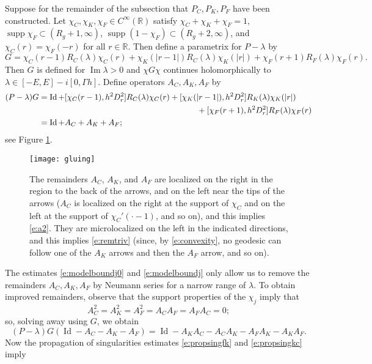 \documentclass[reqno, 12pt]{amsart}
\newcommand \R {\mathbb{R}}
\newcommand \Oh {\mathcal{O}}
\DeclareMathOperator \im {Im}
\DeclareMathOperator \supp {supp}
\DeclareMathOperator \Id {Id}
\theoremstyle{definition}
\numberwithin{equation}{section}
\numberwithin{prop}{section}
\numberwithin{figure}{section}
\begin{document}
Suppose for the remainder of the subsection that $P_C,P_K,P_F$ have been constructed. Let $\chi_C,\chi_K,\chi_F \in C^\infty(\R)$ satisfy $\chi_C + \chi_K + \chi_F = 1$,   $\supp \chi_F \subset (R_g + 1, \infty)$, $\supp (1-\chi_F) \subset (R_g+2,\infty)$, and $\chi_C(r) = \chi_F(-r)$ for all $r \in \R$. Then define a parametrix for $P-\lambda$ by
\[
G = \chi_C(r - 1)R_C(\lambda) \chi_C(r) + \chi_K(|r - 1|)R_C(\lambda) \chi_K(|r|) + \chi_F(r + 1)R_F(\lambda) \chi_F(r).
\]
Then $G$ is defined for $\im \lambda > 0$ and $\chi G \chi$ continues holomorphically to $\lambda \in [-E,E] - i[0,\Gamma h]$. Define operators $A_C,A_K,A_F$ by
\[\begin{split}
(P - \lambda)G &= \Id + [\chi_C(r - 1),h^2D_r^2]R_C(\lambda) \chi_C(r) +  [\chi_K(|r - 1|),h^2D_r^2] R_K(\lambda) \chi_K(|r|) \\ 
& \hspace{2.7in} + [\chi_F(r + 1),h^2D_r^2]R_F(\lambda) \chi_F(r) \\
&= \Id + A_C + A_K + A_F;
\end{split}\]
see Figure \ref{f:gluing}.
\begin{figure}[htbp]
\texttt{[image: gluing]}
\caption{The remainders $A_C$, $A_K$, and $A_F$ are localized on the right  in the region to the back of the arrows, and on the left near the tips of the arrows ($A_C$ is localized on the right at the support of $\chi_C$ and on the left at the support of $\chi_C'(\cdot-1)$, and so on), and this implies \eqref{e:a2}. They are microlocalized on the left in the indicated directions, and this implies \eqref{e:remtriv} (since, by \eqref{e:convexity}, no geodesic can follow one of the $A_K$ arrows and then the $A_F$ arrow, and so on).}\label{f:gluing}
\end{figure}
The estimates \eqref{e:modelboundj0} and \eqref{e:modelboundj} only allow us to remove the remainders $A_C,A_K,A_F$ by Neumann series for a narrow range of $\lambda$. To obtain improved remainders, observe that the support properties of the $\chi_j$ imply that
\begin{equation}\label{e:a2}
A_C^2 = A_K^2 = A_F^2 = A_C A_F = A_FA_C = 0;
\end{equation}
so, solving away using $G$, we obtain
\[
(P - \lambda) G(\Id - A_C - A_K - A_F) = \Id - A_KA_C - A_CA_K - A_FA_K - A_KA_F.
\]
Now the propagation of singularities estimates \eqref{e:propsingfk} and \eqref{e:propsingkc} imply%
\end{document}
